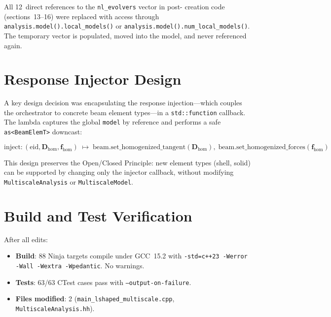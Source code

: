 All 12~direct references to the \texttt{nl\_evolvers} vector in post-
creation code (sections~13--16) were replaced with access through
\verb|analysis.model().local_models()| or
\verb|analysis.model().num_local_models()|.  The temporary vector
is populated, moved into the model, and never referenced again.


\section{Response Injector Design}
\label{sec:driver-injector}

A key design decision was encapsulating the response injection---which
couples the orchestrator to concrete beam element types---in a
\texttt{std::function} callback.  The lambda captures the global
\texttt{model} by reference and performs a safe \texttt{as<BeamElemT>}
downcast:

\begin{equation}
  \text{inject}: (\text{eid}, \mathbf{D}_\text{hom},
    \mathbf{f}_\text{hom})
  \;\mapsto\;
  \text{beam.set\_homogenized\_tangent}(\mathbf{D}_\text{hom}),\;
  \text{beam.set\_homogenized\_forces}(\mathbf{f}_\text{hom})
\end{equation}

This design preserves the Open/Closed Principle: new element types
(shell, solid) can be supported by changing only the injector callback,
without modifying \texttt{MultiscaleAnalysis} or
\texttt{MultiscaleModel}.


\section{Build and Test Verification}
\label{sec:driver-verification}

After all edits:

\begin{itemize}
  \item \textbf{Build}: 88 Ninja targets compile under GCC~15.2 with
    \texttt{-std=c++23 -Werror -Wall -Wextra -Wpedantic}.  No
    warnings.
  \item \textbf{Tests}: 63/63 CTest cases pass with
    \texttt{--output-on-failure}.
  \item \textbf{Files modified}: 2
    (\texttt{main\_lshaped\_multiscale.cpp},
     \texttt{MultiscaleAnalysis.hh}).
\end{itemize}


